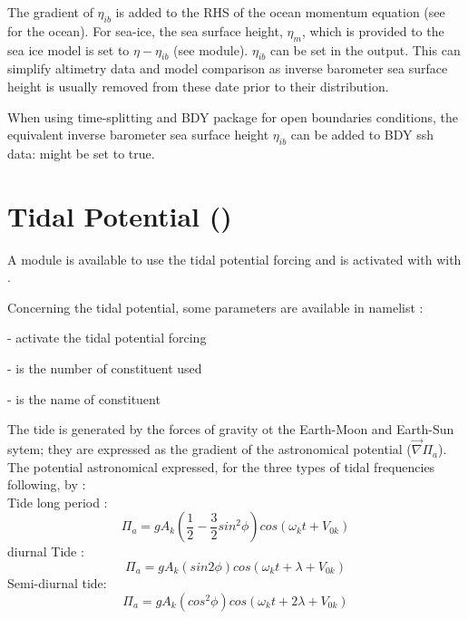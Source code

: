 The gradient of $\eta_{ib}$ is added to the RHS of the ocean momentum equation 
(see  for the ocean). For sea-ice, the sea surface height, $\eta_m$, 
which is provided to the sea ice model is set to $\eta - \eta_{ib}$ (see  module).
$\eta_{ib}$ can be set in the output. This can simplify altimetry data and model comparison 
as inverse barometer sea surface height is usually removed from these date prior to their distribution.

When using time-splitting and BDY package for open boundaries conditions, the equivalent 
inverse barometer sea surface height $\eta_{ib}$ can be added to BDY ssh data: 
  might be set to true.

\section   [Tidal Potential (\textit{sbctide})]
                        {Tidal Potential ()}
\label{SBC_tide}

A module is available to use the tidal potential forcing and is activated with with .



Concerning the tidal potential, some parameters are available in namelist :

-  activate the tidal potential forcing

-  is the number of constituent used

-  is the name of constituent


The tide is generated by the forces of gravity ot the Earth-Moon and Earth-Sun sytem;
they are expressed as the gradient of the astronomical potential ($\vec{\nabla}\Pi_{a}$). \\

The potential astronomical expressed, for the three types of tidal frequencies
following, by : \\
Tide long period :
\begin{equation}
\Pi_{a}=gA_{k}(\frac{1}{2}-\frac{3}{2}sin^{2}\phi)cos(\omega_{k}t+V_{0k})
\end{equation}
diurnal Tide :
\begin{equation}
\Pi_{a}=gA_{k}(sin 2\phi)cos(\omega_{k}t+\lambda+V_{0k})
\end{equation}
Semi-diurnal tide:
\begin{equation}
\Pi_{a}=gA_{k}(cos^{2}\phi)cos(\omega_{k}t+2\lambda+V_{0k})
\end{equation}



